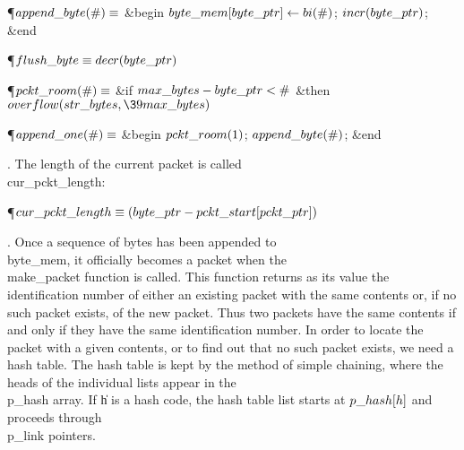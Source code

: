 \Y\P\D {}$\\{append\_byte}(\#)\S$\6
\&{begin} $\\{byte\_mem}[\\{byte\_ptr}]\K\\{bi}(\#)$;\5
$\\{incr}(\\{byte\_ptr})$;\6
\&{end}\par
\P\D {}$\\{flush\_byte}\S\\{decr}(\\{byte\_ptr})$\par
\P\D {}$\\{pckt\_room}(\#)\S$\6
\&{if} $\\{max\_bytes}-\\{byte\_ptr}<\#$ \1\&{then}\5
$\\{overflow}(\\{str\_bytes},\39\\{max\_bytes})$\2\par
\P\D {}$\\{append\_one}(\#)\S$\1\6
\&{begin} $\\{pckt\_room}(1)$;\5
$\\{append\_byte}(\#)$;\6
\&{end}\2\par
\fi

. The length of the current packet is called \\{cur\_pckt\_length}:

\Y\P\D {}$\\{cur\_pckt\_length}\S(\\{byte\_ptr}-\\{pckt\_start}[\\{pckt%
\_ptr}])$\par
\fi

. Once a sequence of bytes has been appended to \\{byte\_mem}, it
officially becomes a packet when the \\{make\_packet} function is called.
This function returns as its value the identification number of either
an existing packet with the same contents or, if no such packet exists,
of the new packet. Thus two packets have the same contents if and only
if they have the same identification number. In order to locate the
packet with a given contents, or to find out that no such packet exists,
we need a hash table. The hash table is kept by the method of simple
chaining, where the heads of the individual lists appear in the \\{p\_hash}
array. If \|h is a hash code, the hash table list starts at $\\{p\_hash}[\|h]$
and proceeds through \\{p\_link} pointers.

